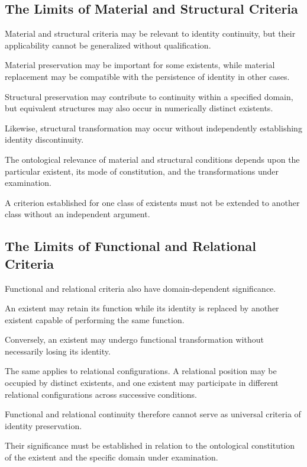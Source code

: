 \subsection{The Limits of Material and Structural Criteria}

Material and structural criteria may be relevant
to identity continuity, but their applicability
cannot be generalized without qualification.

Material preservation may be important for some
existents, while material replacement may be
compatible with the persistence of identity in
other cases.

Structural preservation may contribute to continuity
within a specified domain, but equivalent structures
may also occur in numerically distinct existents.

Likewise, structural transformation may occur
without independently establishing identity
discontinuity.

The ontological relevance of material and structural
conditions depends upon the particular existent,
its mode of constitution, and the transformations
under examination.

A criterion established for one class of existents
must not be extended to another class without
an independent argument.

\subsection{The Limits of Functional and Relational Criteria}

Functional and relational criteria also have
domain-dependent significance.

An existent may retain its function while its
identity is replaced by another existent capable
of performing the same function.

Conversely, an existent may undergo functional
transformation without necessarily losing its
identity.

The same applies to relational configurations.
A relational position may be occupied by distinct
existents, and one existent may participate in
different relational configurations across successive
conditions.

Functional and relational continuity therefore
cannot serve as universal criteria of identity
preservation.

Their significance must be established in relation
to the ontological constitution of the existent
and the specific domain under examination.

